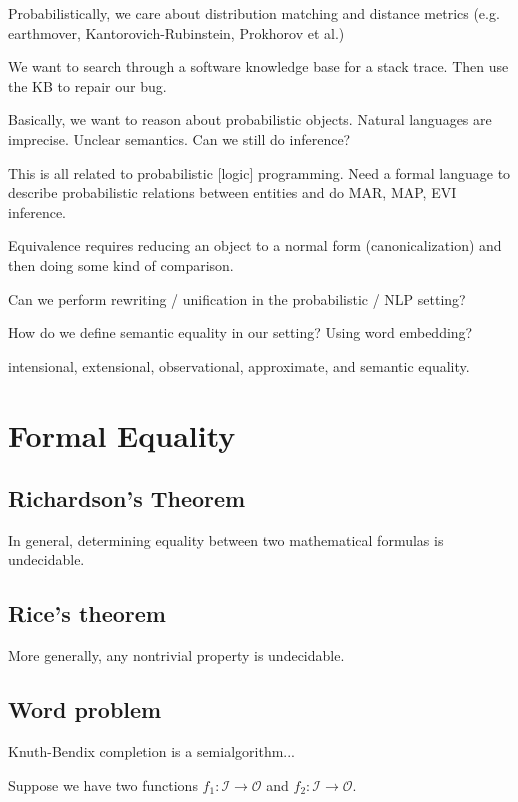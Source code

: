 \documentclass[11pt]{article}
\begin{document}
    Probabilistically, we care about distribution matching and distance metrics (e.g. earthmover, Kantorovich-Rubinstein, Prokhorov et al.)

    We want to search through a software knowledge base for a stack trace. Then use the KB to repair our bug.

    Basically, we want to reason about probabilistic objects. Natural languages are imprecise. Unclear semantics. Can we still do inference?

    This is all related to probabilistic [logic] programming. Need a formal language to describe probabilistic relations between entities and do MAR, MAP, EVI inference.

    Equivalence requires reducing an object to a normal form (canonicalization) and then doing some kind of comparison.

    Can we perform rewriting / unification in the probabilistic / NLP setting?

    How do we define semantic equality in our setting? Using word embedding?

        intensional, extensional, observational, approximate, and semantic equality.

    \section{Formal Equality}

    \subsection{Richardson's Theorem}

    In general, determining equality between two mathematical formulas is undecidable.

    \subsection{Rice's theorem}

    More generally, any nontrivial property is undecidable.

    \subsection{Word problem}

    Knuth-Bendix completion is a semialgorithm...

    Suppose we have two functions $f_1: \mathcal{I} \rightarrow \mathcal{O}$ and $f_2: \mathcal{I}\rightarrow \mathcal{O}$.
\end{document}
